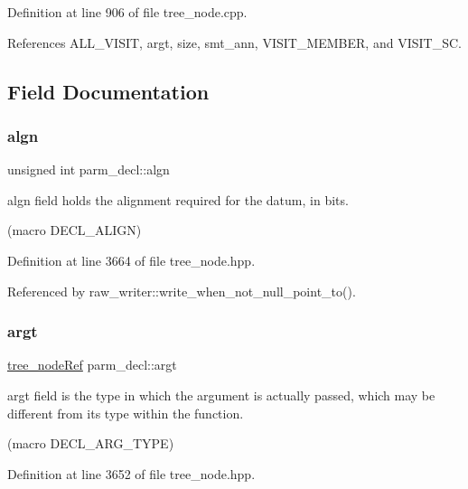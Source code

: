 Definition at line 906 of file tree\+\_\+node.\+cpp.



References A\+L\+L\+\_\+\+V\+I\+S\+IT, argt, size, smt\+\_\+ann, V\+I\+S\+I\+T\+\_\+\+M\+E\+M\+B\+ER, and V\+I\+S\+I\+T\+\_\+\+SC.



\subsection{Field Documentation}
\mbox{\label{structparm__decl_acca449ccbcb857450bcd279ea32d1299}} 
\subsubsection{\texorpdfstring{algn}{algn}}
{\footnotesize\ttfamily unsigned int parm\+\_\+decl\+::algn}



algn field holds the alignment required for the datum, in bits. 

(macro D\+E\+C\+L\+\_\+\+A\+L\+I\+GN) 

Definition at line 3664 of file tree\+\_\+node.\+hpp.



Referenced by raw\+\_\+writer\+::write\+\_\+when\+\_\+not\+\_\+null\+\_\+point\+\_\+to().

\mbox{\label{structparm__decl_aab7d1a10bdaa3b92d51371a51432ebed}} 
\subsubsection{\texorpdfstring{argt}{argt}}
{\footnotesize\ttfamily \hyperlink{tree__node_8hpp_a6ee377554d1c4871ad66a337eaa67fd5}{tree\+\_\+node\+Ref} parm\+\_\+decl\+::argt}



argt field is the type in which the argument is actually passed, which may be different from its type within the function. 

(macro D\+E\+C\+L\+\_\+\+A\+R\+G\+\_\+\+T\+Y\+PE) 

Definition at line 3652 of file tree\+\_\+node.\+hpp.



